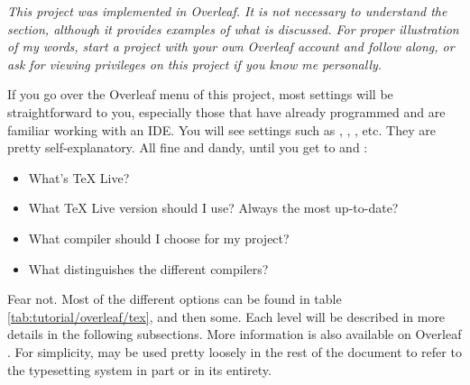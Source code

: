 \textit{This project was implemented in Overleaf. It is not necessary to understand the section, although it provides examples of what is discussed. For proper illustration of my words, start a project with your own Overleaf account and follow along, or ask for viewing privileges on this project if you know me personally.}

\hr

If you go over the Overleaf menu of this project, most settings will be straightforward to you, especially those that have already programmed and are familiar working with an \gls{IDE}. You will see settings such as , , , etc. They are pretty self-explanatory. All fine and dandy, until you get to  and :
\begin{itemize}
    \item What's \TeX{} Live?
    \item What \TeX{} Live version should I use? Always the most up-to-date?
    \item What compiler should I choose for my project?
    \item What distinguishes the different compilers?
\end{itemize} 

Fear not. Most of the different options can be found in table \ref{tab:tutorial/overleaf/tex}, and then some. Each level will be described in more details in the following subsections. More information is also available on Overleaf \parencite{web:overleaf-flavours-tex}. For simplicity, \guil{\LaTeX} may be used pretty loosely in the rest of the document to refer to the typesetting system in part or in its entirety.

\begingroup
    \setlength{\columnA}{\dimexpr .16\linewidth}
    \setlength{\columnB}{\dimexpr .16\linewidth}
    \setlength{\columnC}{\dimexpr \linewidth-\columnA-\columnB}
    
    \setlength{\columnA}{\columnA-2\tabcolsep-4\vbar/3}
    \setlength{\columnB}{\columnB-2\tabcolsep-4\vbar/3}
    \setlength{\columnC}{\columnC-2\tabcolsep-4\vbar/3}
    
